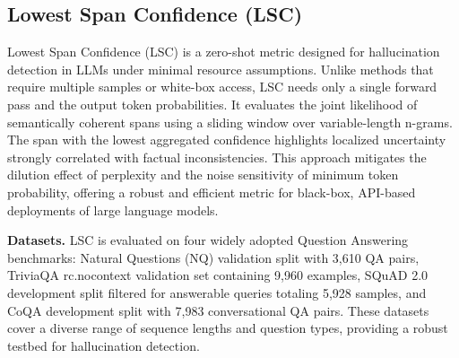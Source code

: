 \subsection{Lowest Span Confidence (LSC)}

Lowest Span Confidence (LSC) \cite{qiao2024lsc} is a zero-shot metric designed for hallucination detection in LLMs under minimal resource assumptions. Unlike methods that require multiple samples or white-box access, LSC needs only a single forward pass and the output token probabilities. It evaluates the joint likelihood of semantically coherent spans using a sliding window over variable-length n-grams. The span with the lowest aggregated confidence highlights localized uncertainty strongly correlated with factual inconsistencies. This approach mitigates the dilution effect of perplexity and the noise sensitivity of minimum token probability, offering a robust and efficient metric for black-box, API-based deployments of large language models.

\textbf{Datasets.} LSC is evaluated on four widely adopted Question Answering benchmarks: Natural Questions (NQ) \cite{kwiatkowski2019natural} validation split with 3,610 QA pairs, TriviaQA \cite{joshi2017triviaqa} rc.nocontext validation set containing 9,960 examples, SQuAD 2.0 \cite{rajpurkar2018squad2} development split filtered for answerable queries totaling 5,928 samples, and CoQA \cite{reddy2019coqa} development split with 7,983 conversational QA pairs. These datasets cover a diverse range of sequence lengths and question types, providing a robust testbed for hallucination detection.


